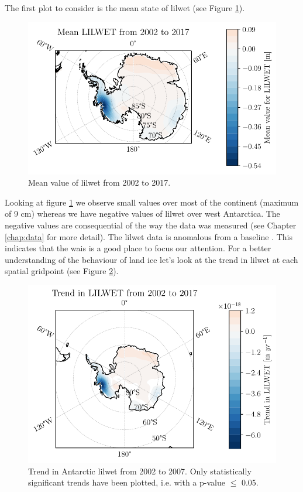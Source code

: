 \documentclass[../main.tex]{subfiles}
\begin{document}
The first plot to consider is the mean state of \gls{lilwet} (see Figure \ref{fig:lilwet_mean}).
 \begin{figure}[hbt!]
     \centering
     \includegraphics{images/2021w5/chapter7/hres/mean_spatial_LIC}
     \caption{Mean value of \gls{lilwet} from 2002 to 2017.}
     \label{fig:lilwet_mean}
 \end{figure}
 Looking at figure \ref{fig:lilwet_mean} we observe small values over most of the continent (maximum of 9 cm) whereas we have negative values of \gls{lilwet} over west Antarctica. The negative values are consequential of the way the data was measured (see Chapter \ref{chap:data} for more detail). The \gls{lilwet} data is anomalous from a baseline . This indicates that the \gls{wais} is a good place to focus our attention. For a better understanding of the behaviour of land ice let's look at the trend in \gls{lilwet} at each spatial gridpoint (see Figure \ref{fig:lilwet_trend}).
\begin{figure}[hbt!]
    \centering
    \includegraphics{images/2021w5/chapter7/hres/trend_spatial_LIC}
    \caption{Trend in Antarctic \gls{lilwet} from 2002 to 2007. Only statistically significant trends have been plotted, i.e. with a p-value $\leq$ 0.05.}
    \label{fig:lilwet_trend}
\end{figure}
\end{document}
